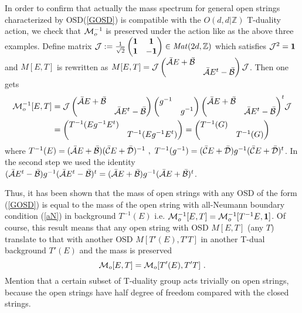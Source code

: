 \documentclass[a4paper,12pt]{article}
\newcommand{\Z}{{\mathbb{Z}}}
\newcommand{\bp}{\begin{pmatrix}}
\newcommand{\ep}{\end{pmatrix}}
\newcommand{\no}{\nonumber}
\def \cJ{{\cal J}}
\def \cAb{{\bar {\cal A}}}
\def \cBb{{\bar {\cal B}}}
\def \cCb{{\bar {\cal C}}}
\def \cDb{{\bar {\cal D}}}
\def \ov#1{\frac{1}{#1}}
\def \cM{{\cal M}}
\def \1{{\bf 1}}
\def \Mat{\mathit{Mat}}
\begin{document}
In order to confirm that actually the mass spectrum for 
general open strings characterized by OSD(\ref{GOSD}) is compatible 
with the $O(d,d |\Z)$ T-duality action, we check that 
$\cM_o^{-1}$ is preserved under the action 
like as the above three examples. 
Define matrix \begin{math}
\cJ:=\ov{\sqrt{2}}\bp \1&\1 \\ \1&-\1\ep\in\Mat(2d,\Z)\end{math} 
which satisfies $\cJ^2=\1$ 
and $M[E, T]$ is rewritten as \begin{math}
M[E, T]=\cJ \bp \cAb E+\cBb & \\ &\cAb E^t-\cBb\ep\cJ\end{math}. 
Then one gets 
\begin{equation}
 \begin{split}
 \cM_o^{-1}[E,T]&=\cJ
             \bp \cAb E+\cBb & \\ &\cAb E^t-\cBb\ep
             \bp g^{-1}& \\ &g^{-1}\ep
             {\bp \cAb E+\cBb & \\ &\cAb E^t-\cBb\ep}^t \cJ\\
 &=\bp T^{-1}(E g^{-1} E^t)& \\
                & T^{-1}(E g^{-1} E^t)\ep
           =\bp T^{-1}(G) & \\ &T^{-1}(G) \ep \no
 \end{split}
\end{equation}
where 
\begin{math} T^{-1}(E)=(\cAb E+\cBb)(\cCb E+\cDb)^{-1}\ ,\ 
 T^{-1}(g^{-1})=(\cCb E+\cDb)g^{-1}(\cCb E+\cDb)^t
\end{math}. In the second step we used the identity 
$(\cAb E^t-\cBb)g^{-1}(\cAb E^t-\cBb)^t
=(\cAb E+\cBb)g^{-1}(\cAb E+\cBb)^t$. 

Thus, it has been shown that 
the mass of open strings with any OSD of the form 
(\ref{GOSD}) is equal to the mass of 
the open string with all-Neumann boundary condition 
(\ref{aN}) in background $T^{-1}(E)$ i.e. 
$\cM_o^{-1}[E,T]=\cM_o^{-1}[T^{-1}E,\1]$. 
Of course, this result means that any 
open string with OSD $M[E,T]$ (any $T$) 
translate to that with another OSD $M[T'(E),T'T]$ 
in another T-dual background $T'(E)$ and the mass is preserved
\begin{equation}
 \cM_o[E,T]=\cM_o[T'(E),T'T]\ . \label{proof}
\end{equation}
Mention that a certain subset of T-duality group acts trivially 
on open strings, because the open strings have 
half degree of freedom compared with the closed strings. 
\end{document}
